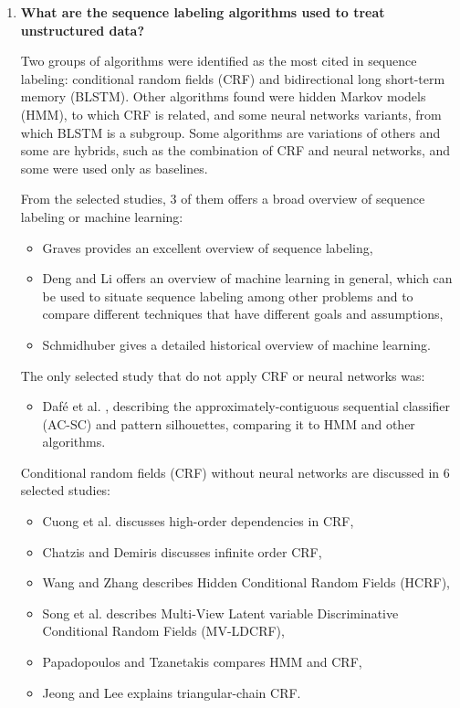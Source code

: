 \begin{enumerate}
\item   \textbf{What are the sequence labeling algorithms used to treat unstructured data?}

Two groups of algorithms were identified as the most cited in sequence labeling: conditional random fields (CRF) and bidirectional long short-term memory (BLSTM). 
Other algorithms found were hidden Markov models (HMM), to which CRF is related, and some neural networks variants, from which BLSTM is a subgroup. 
Some algorithms are variations of others and some are hybrids, such as the combination of CRF and neural networks, and some were used only as baselines.

From the selected studies,
3 of them offers a broad overview of sequence labeling or machine learning: 
\begin{itemize}
        \item 
    Graves \cite{gravessupervised} provides an excellent overview of sequence labeling, 
        \item 
    Deng and Li \cite{6423821} offers an overview of machine learning in general, which can be used to situate sequence labeling among other problems and to compare different techniques that have different goals and assumptions, 
        \item 
    Schmidhuber \cite{Schmidhuber201585} gives a detailed historical overview of machine learning.
\end{itemize}

The only selected study that do not apply CRF or neural networks was:
    \begin{itemize}
        \item 
    Daf{\'e} et al. \cite{dafe2015learning}, describing the approximately-contiguous sequential classifier (AC-SC) and pattern silhouettes, comparing it to HMM and other algorithms.
\end{itemize}

        
Conditional random fields (CRF) without neural networks are discussed in 
6 selected studies:
\begin{itemize}
        \item 
    Cuong et al. \cite{Cuong:2014:CRF:2627435.2638567} discusses high-order dependencies in CRF,
        \item 
    Chatzis and Demiris \cite{Chatzis20131523} discusses infinite order CRF, 
        \item 
    Wang and Zhang \cite{6213103} describes Hidden Conditional Random Fields (HCRF), 
        \item 
    Song et al. \cite{6247918} describes Multi-View Latent variable Discriminative Conditional Random Fields (MV-LDCRF),
        \item 
    Papadopoulos and Tzanetakis \cite{7579173} compares HMM and CRF,
        \item 
    Jeong and Lee \cite{4599397} explains triangular-chain CRF.
\end{itemize}


\end{enumerate}
